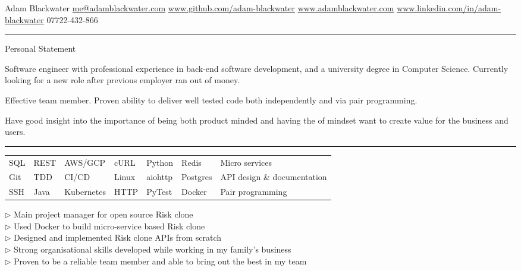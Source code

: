 \documentclass[12pt,twoside]{article}
\begin{document}
\topheading
    {Adam Blackwater}
    {\url{me@adamblackwater.com} \hspace{0.15em}}
    {\url{www.github.com/adam-blackwater}}
    {\url{www.adamblackwater.com}}
    {\url{www.linkedin.com/in/adam-blackwater}}
    {07722-432-866}
    

\vspace{0.5em}
\hrule
\vspace{0.5em}

\statement
    {Personal Statement}
    {
        Software engineer with professional experience in back-end software
        development, and a university degree in Computer Science. Currently
        looking for a new role after previous employer ran out of money.

        \hspace{1.5em}Effective team member. Proven ability to deliver well
        tested code both independently and via pair programming. 

        \hspace{1.5em}Have good insight into the importance of being both
        product minded and having the of mindset want to create value for the
        business and users.
    }

\vspace{0.5em}
\hrule
\vspace{0.5em}

\begin{center}
    \begin{tabular}{l l l l l l l}
        SQL & REST & AWS/GCP & cURL & Python & Redis & Micro services \\
        Git & TDD & CI/CD & Linux & aiohttp & Postgres & API design \& documentation \\
        SSH & Java & Kubernetes & HTTP & PyTest& Docker & Pair programming
    \end{tabular}
\end{center}
    
\parbox{35em}{
    $\triangleright$ Main project manager for open source Risk clone \\
    $\triangleright$ Used Docker to build micro-service based Risk clone \\
    $\triangleright$ Designed and implemented Risk clone APIs from scratch \\
    $\triangleright$ Strong organisational skills developed while working in my family's business \\
    $\triangleright$ Proven to be a reliable team member and able to bring out the best in my team
    }
\end{document}
